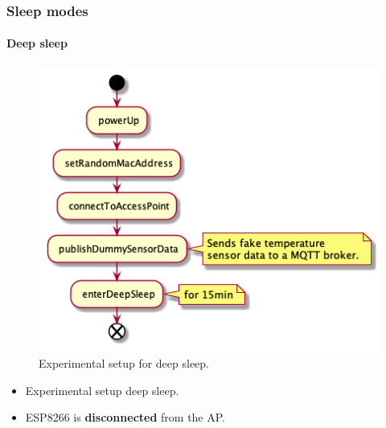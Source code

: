 \begin{frame}
    \frametitle{Sleep modes}
    \framesubtitle{Deep sleep}

    \begin{minipage}{0.45 \textwidth}
        \begin{figure}[H]
            \centering
            \includegraphics[width = 1 \linewidth]{../paper/fig/sequence_deep_sleep.png}
            \caption{Experimental setup for deep sleep.}
            \label{fig:experiment_modem_light_sleep}
        \end{figure}
    \end{minipage}
    \begin{minipage}{0.45 \textwidth}
        \begin{itemize}
            \item Experimental setup deep sleep.
            \item ESP8266 is \textbf{disconnected} from the AP.
        \end{itemize}
    \end{minipage}
\end{frame}

